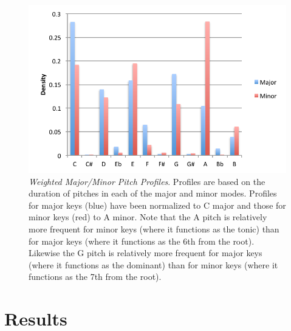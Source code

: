 \documentclass[letterpaper]{article}
\begin{document}
\begin{figure}
  \centering
 \includegraphics[width=.5\textwidth]{./PitchProfilesWeighted.pdf}
  \caption{\emph{Weighted Major/Minor Pitch Profiles}. Profiles are based on the duration of pitches in each of the major and minor modes. Profiles for major keys (blue) have been normalized to C major and those for minor keys (red) to A minor. Note that the A pitch is relatively more frequent for minor keys (where it functions as the tonic) than for major keys (where it functions as the 6th from the root). Likewise the G pitch is relatively more frequent for major keys (where it functions as the dominant) than for minor keys (where it functions as the 7th from the root).}
  \label{fig:pitch_profiles}
\end{figure}


\section{Results}
\end{document}
